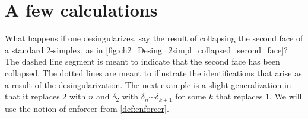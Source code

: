 


\section{A few calculations}
\label{sec:examples}

What happens if one desingularizes, say the result of collapsing the second face of a standard $2$-simplex, as in \cref{fig:ch2_Desing_2simpl_collapsed_second_face}? The dashed line segment is meant to indicate that the second face has been collapsed. The dotted lines are meant to illustrate the identifications that arise as a result of the desingularization. The next example is a slight generalization in that it replaces $2$ with $n$ and $\delta _2$ with $\delta _n\cdots \delta _{k+1}$ for some $k$ that replaces $1$. We will use the notion of enforcer from \cref{def:enforcer}.
